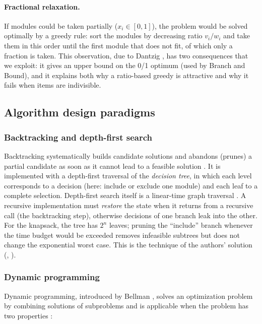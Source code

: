 \paragraph{Fractional relaxation.} If modules could be taken partially ($x_i\in[0,1]$), the problem would be solved optimally by a greedy rule: sort the modules by decreasing ratio $v_i/w_i$ and take them in this order until the first module that does not fit, of which only a fraction is taken. This observation, due to Dantzig \cite{dantzig1957}, has two consequences that we exploit: it gives an upper bound on the 0/1 optimum (used by Branch and Bound), and it explains both why a ratio-based greedy is attractive and why it fails when items are indivisible.

\subsection{Algorithm design paradigms}

\subsubsection{Backtracking and depth-first search}

Backtracking systematically builds candidate solutions and abandons (prunes) a partial candidate as soon as it cannot lead to a feasible solution \cite{golomb1965}. It is implemented with a depth-first traversal of the \emph{decision tree}, in which each level corresponds to a decision (here: include or exclude one module) and each leaf to a complete selection. Depth-first search itself is a linear-time graph traversal \cite{tarjan1972,cormen2022}. A recursive implementation must \emph{restore} the state when it returns from a recursive call (the backtracking step), otherwise decisions of one branch leak into the other. For the knapsack, the tree has $2^n$ leaves; pruning the ``include'' branch whenever the time budget would be exceeded removes infeasible subtrees but does not change the exponential worst case. This is the technique of the authors' solution (, ).

\subsubsection{Dynamic programming}

Dynamic programming, introduced by Bellman \cite{bellman1957}, solves an optimization problem by combining solutions of subproblems and is applicable when the problem has two properties \cite{cormen2022,kleinberg2006}:

